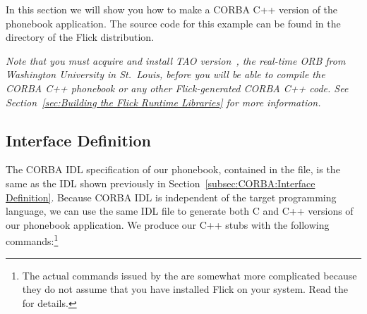 

In this section we will show you how to make a CORBA C++ version of the
phonebook application.  The source code for this example can be found in the
 directory of the Flick distribution.

\emph{Note that you must acquire and install TAO version~\taoversion{}, the
real-time ORB from Washington University in St.\ Louis, before you will be able
to compile the CORBA C++ phonebook or any other Flick-generated CORBA C++ code.
See Section~\ref{sec:Building the Flick Runtime Libraries} for more
information.}



\subsection{Interface Definition}
\label{subsec:CORBAXX:Interface Definition}

The CORBA IDL specification of our phonebook, contained in the
 file, is the same as the IDL shown previously in
Section~\ref{subsec:CORBA:Interface Definition}.  Because CORBA IDL is
independent of the target programming language, we can use the same IDL file to
generate both C and C++ versions of our phonebook application.
%
We produce our C++ stubs with the following commands:\footnote{The actual
commands issued by the  are somewhat more complicated
because they do not assume that you have installed Flick on your system.  Read
the  for details.}

